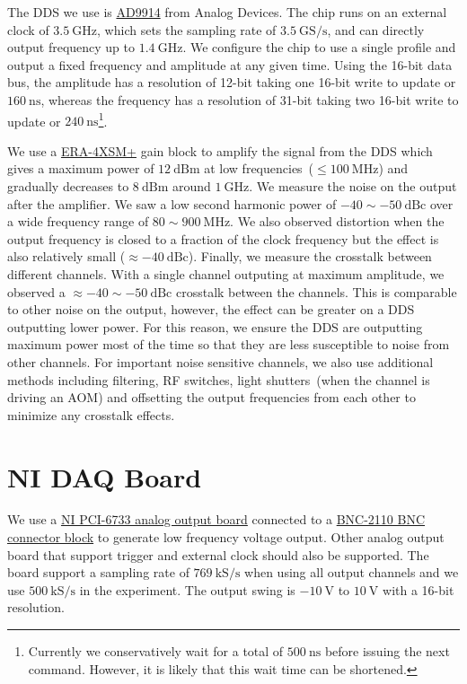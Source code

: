 The DDS we use is \href{https://www.analog.com/en/products/ad9914.html}{AD9914}
from Analog Devices.
The chip runs on an external clock of $3.5~\mathrm{GHz}$,
which sets the sampling rate of $3.5~\mathrm{GS/s}$,
and can directly output frequency up to $1.4~\mathrm{GHz}$.
We configure the chip to use a single profile and output a fixed frequency and amplitude
at any given time.
Using the 16-bit data bus,
the amplitude has a resolution of 12-bit taking one 16-bit write to update or $160~\mathrm{ns}$,
whereas the frequency has a resolution of 31-bit
taking two 16-bit write to update or $240~\mathrm{ns}$\footnote{
  Currently we conservatively wait for a total of $500~\mathrm{ns}$
  before issuing the next command.
  However, it is likely that this wait time can be shortened.
}.

We use a \href{https://www.minicircuits.com/WebStore/dashboard.html?model=ERA-4XSM\%2B}{ERA-4XSM+}
gain block to amplify the signal from the DDS which gives a maximum power of $12~\mathrm{dBm}$
at low frequencies~($\leqslant100~\mathrm{MHz}$) and gradually decreases to $8~\mathrm{dBm}$
around $1~\mathrm{GHz}$.
We measure the noise on the output after the amplifier.
We saw a low second harmonic power of $-40\sim-50~\mathrm{dBc}$
over a wide frequency range of $80\sim900~\mathrm{MHz}$.
We also observed distortion when the output frequency is closed to
a fraction of the clock frequency but the effect is also relatively small
($\approx-40~\mathrm{dBc}$).
Finally, we measure the crosstalk between different channels.
With a single channel outputing at maximum amplitude,
we observed a $\approx-40\sim-50~\mathrm{dBc}$ crosstalk between the channels.
This is comparable to other noise on the output, however,
the effect can be greater on a DDS outputting lower power.
For this reason, we ensure the DDS are outputting maximum power most of the time
so that they are less susceptible to noise from other channels.
For important noise sensitive channels,
we also use additional methods including filtering, RF switches,
light shutters~(when the channel is driving an AOM)
and offsetting the output frequencies from each other to minimize any crosstalk effects.

\section{NI DAQ Board}
\label{appendex:computer-control:nidaq}

We use a \href{https://www.ni.com/en-us/support/model.pci-6733.html}
{NI PCI-6733 analog output board} connected to a
\href{https://www.ni.com/en-us/support/model.bnc-2110.html}{BNC-2110 BNC connector block}
to generate low frequency voltage output.
Other analog output board that support trigger and external clock should also be supported.
The board support a sampling rate of $769~\mathrm{kS/s}$ when using all output channels
and we use $500~\mathrm{kS/s}$ in the experiment.
The output swing is $-10~\mathrm{V}$ to $10~\mathrm{V}$ with a 16-bit resolution.


